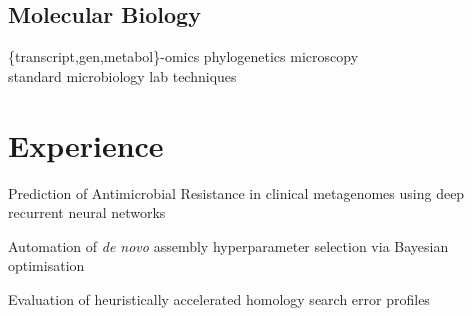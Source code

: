 \documentclass[]{Finlay_Maguire_CV}
\begin{document}
\begin{minipage}[t]{0.33\textwidth}
\subsection{Molecular Biology}
\{transcript,gen,metabol\}-omics \textbullet{} phylogenetics \textbullet{} 
microscopy \textbullet{} \\ standard microbiology lab techniques 
\sectionsep



%
%

\end{minipage} 
\hfill
\begin{minipage}[t]{0.66\textwidth} 


\section{Experience}

\sectionsep
\begin{tightemize}
\item Prediction of Antimicrobial Resistance in clinical metagenomes using deep recurrent neural networks
\item Automation of \textit{de novo} assembly hyperparameter selection via Bayesian optimisation
\item Evaluation of heuristically accelerated homology search error profiles
\end{tightemize}


\end{minipage}
\end{document}

